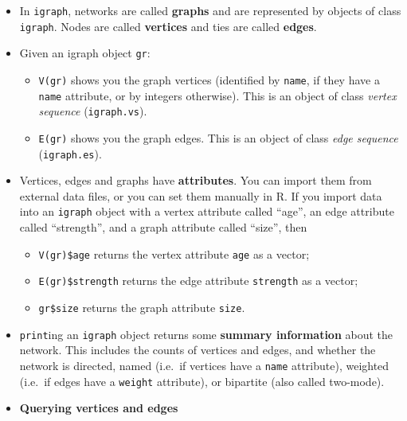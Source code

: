 \documentclass[
]{book}
\providecommand{\tightlist}{%
  \setlength{\itemsep}{0pt}\setlength{\parskip}{0pt}}
\begin{document}
\begin{itemize}
\tightlist
\item
  In \texttt{igraph}, networks are called \textbf{graphs} and are represented by objects of class \texttt{igraph}. Nodes are called \textbf{vertices} and ties are called \textbf{edges}.
\item
  Given an igraph object \texttt{gr}:

  \begin{itemize}
  \tightlist
  \item
    \texttt{V(gr)} shows you the graph vertices (identified by \texttt{name}, if they have a \texttt{name} attribute, or by integers otherwise). This is an object of class \emph{vertex sequence} (\texttt{igraph.vs}).
  \item
    \texttt{E(gr)} shows you the graph edges. This is an object of class \emph{edge sequence} (\texttt{igraph.es}).
  \end{itemize}
\item
  Vertices, edges and graphs have \textbf{attributes}. You can import them from external data files, or you can set them manually in R. If you import data into an \texttt{igraph} object with a vertex attribute called ``age'', an edge attribute called ``strength'', and a graph attribute called ``size'', then

  \begin{itemize}
  \tightlist
  \item
    \texttt{V(gr)\$age} returns the vertex attribute \texttt{age} as a vector;
  \item
    \texttt{E(gr)\$strength} returns the edge attribute \texttt{strength} as a vector;
  \item
    \texttt{gr\$size} returns the graph attribute \texttt{size}.
  \end{itemize}
\item
  \texttt{print}ing an \texttt{igraph} object returns some \textbf{summary information} about the network. This includes the counts of vertices and edges, and whether the network is directed, named (i.e.~if vertices have a \texttt{name} attribute), weighted (i.e.~if edges have a \texttt{weight} attribute), or bipartite (also called two-mode).
\item
  \textbf{Querying vertices and edges}


\end{itemize}
\end{document}
